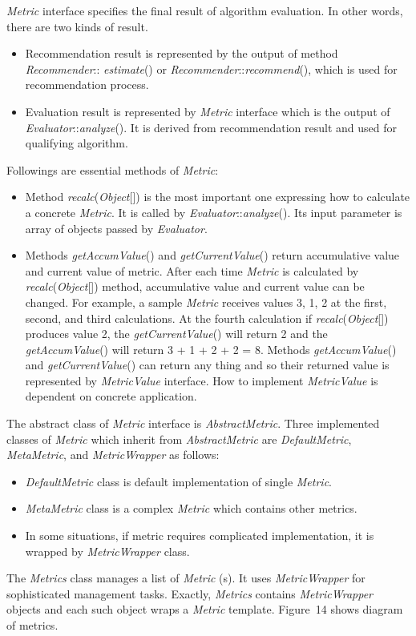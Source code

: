 \documentclass[a4paper]{llncs}
\begin{document}
\textit{Metric} interface specifies the final result of algorithm evaluation. In other words, there are two kinds of result.
\begin{itemize}
\item Recommendation result is represented by the output of method \textit{Recommender}:: \textit{estimate}() or \textit{Recommender}::\textit{recommend}(), which is used for recommendation process.
\item Evaluation result is represented by \textit{Metric} interface which is the output of \textit{Evaluator}::\textit{analyze}(). It is derived from recommendation result and used for qualifying algorithm.
\end{itemize}
Followings are essential methods of \textit{Metric}:
\begin{itemize}
\item Method \textit{recalc}(\textit{Object}[]) is the most important one expressing how to calculate a concrete \textit{Metric}. It is called by \textit{Evaluator}::\textit{analyze}(). Its input parameter is array of objects passed by \textit{Evaluator}.
\item Methods \textit{getAccumValue}() and \textit{getCurrentValue}() return accumulative value and current value of metric. After each time \textit{Metric} is calculated by \textit{recalc}(\textit{Object}[]) method, accumulative value and current value can be changed. For example, a sample \textit{Metric} receives values 3, 1, 2 at the first, second, and third calculations. At the fourth calculation if \textit{recalc}(\textit{Object}[]) produces value 2, the \textit{getCurrentValue}() will return 2 and the \textit{getAccumValue}() will return 3 + 1 + 2 + 2 = 8. Methods \textit{getAccumValue}() and \textit{getCurrentValue}() can return any thing and so their returned value is represented by \textit{MetricValue} interface. How to implement \textit{MetricValue} is dependent on concrete application.
\end{itemize}
The abstract class of \textit{Metric} interface is \textit{AbstractMetric}. Three implemented classes of \textit{Metric} which inherit from \textit{AbstractMetric} are \textit{DefaultMetric}, \textit{MetaMetric}, and \textit{MetricWrapper} as follows:
\begin{itemize}
\item \textit{DefaultMetric} class is default implementation of single \textit{Metric}.
\item \textit{MetaMetric} class is a complex \textit{Metric} which contains other metrics.
\item In some situations, if metric requires complicated implementation, it is wrapped by \textit{MetricWrapper} class.
\end{itemize}
The \textit{Metrics} class manages a list of \textit{Metric} (s). It uses \textit{MetricWrapper} for sophisticated management tasks. Exactly, \textit{Metrics} contains \textit{MetricWrapper} objects and each such object wraps a \textit{Metric} template. Figure~14 shows diagram of metrics.
\end{document}
